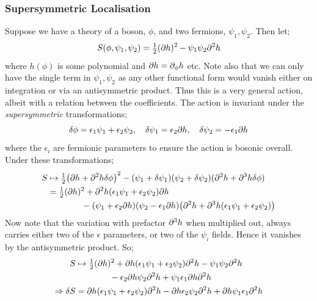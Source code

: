 \subsubsection{Supersymmetric Localisation}
Suppose we have a theory of a boson, $\phi$, and two fermions, $\psi_1, \psi_2$. Then let;
\begin{equation}
S(\phi, \psi_1, \psi_2) = \tfrac{1}{2}(\partial h)^2 - \psi_1 \psi_2 \partial^2 h
\end{equation}
where $h(\phi)$ is some polynomial and $\partial h = \partial_\phi h$ etc. Note also that we can only have the single term in $\psi_1, \psi_2$ as any other functional form would vanish either on integration or via an antisymmetric product. Thus this is a very general action, albeit with a relation between the coefficients. The action is invariant under the \emph{supersymmetric} transformations;
\begin{equation}
\delta\phi = \epsilon_1 \psi_1  + \epsilon_2 \psi_2, \quad \delta \psi_1 = \epsilon_2 \partial h, \quad \delta \psi_2 = - \epsilon_1 \partial h
\end{equation}
where the $\epsilon_i$ are fermionic parameters to ensure the action is bosonic overall. Under these transformations;
\begin{align*}
S &\mapsto \tfrac{1}{2}\left(\del h + \del^2 h \delta \phi\right)^2 - (\psi_1 + \delta \psi_1)(\psi_2 + \delta \psi_2)(\del^2 h + \del^3 h \delta\phi) \\
&= \tfrac{1}{2}(\del h)^2 + \del^2 h (\epsilon_1 \psi_1 + \epsilon_2 \psi_2) \del h \\
&\qquad\qquad- (\psi_1 + \epsilon_2 \del h)(\psi_2 - \epsilon_1 \del h)\left(\del^2 h + \del^3 h (\epsilon_1 \psi_1 + \epsilon_2 \psi_2) \right)
\end{align*}
Now note that the variation with prefactor $\partial^3 h$ when multiplied out, always carries either two of the $\epsilon$ parameters, or two of the $\psi_i$ fields. Hence it vanishes by the antisymmetric product. So;
\begin{align*}
S &\mapsto \tfrac{1}{2}(\partial h)^2 + \partial h (\epsilon_1 \psi_1 + \epsilon_2 \psi_2)\partial^2 h - \psi_1 \psi_2 \partial^2 h \\
&\qquad \qquad- \epsilon_2 \partial h \psi_2 \partial^2 h + \psi_1 \epsilon_1 \partial h \partial^2 h \\
\Rightarrow \delta S &= \partial h (\epsilon_1 \psi_1 + \epsilon_2 \psi_2)\partial^2 h - \partial h \epsilon_2 \psi_2 \partial^2 h + \partial h \psi_1 \epsilon_1 \partial^2 h
\end{align*}
